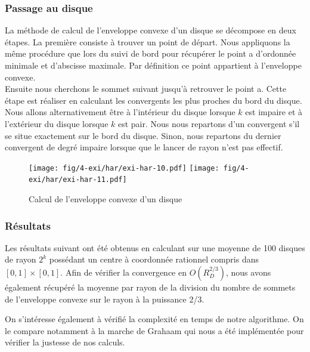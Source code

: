 
\subsubsection{Passage au disque}


La méthode de calcul de l'enveloppe convexe d'un disque se décompose en deux étapes. La première consiste à trouver un point de départ. Nous appliquons la même procédure que lors du suivi de bord pour récupérer le point a d'ordonnée minimale et d'abscisse maximale. Par définition ce point appartient à l'enveloppe convexe.\\

Ensuite nous cherchons le sommet suivant jusqu'à retrouver le point a. Cette étape est réaliser en calculant les convergents les plus proches du bord du disque. Nous allons alternativement être à l'intérieur du disque lorsque $k$ est impaire et à l'extérieur du disque lorsque $k$ est pair. Nous nous repartons d'un convergent s'il se situe exactement sur le bord du disque. Sinon, nous repartons du dernier convergent de degré impaire lorsque que le lancer de rayon n'est pas effectif.\\

\begin{figure}[H]
  \centering
  \texttt{[image: fig/4-exi/har/exi-har-10.pdf]}
  \texttt{[image: fig/4-exi/har/exi-har-11.pdf]}
  \caption{Calcul de l'enveloppe convexe d'un disque}
\end{figure}

\subsubsection{Résultats}

Les résultats suivant ont été obtenus en calculant sur une moyenne de 100 disques de rayon $2^k$ possédant un centre à coordonnée rationnel compris dans $[0,1]\times[0,1]$. Afin de vérifier la convergence en $O(R_{D}^{2/3})$, nous avons également récupéré la moyenne par rayon de la division du nombre de sommets de l'enveloppe convexe sur le rayon à la puissance 2/3.

On s'intéresse également à vérifié la complexité en temps de notre algorithme. On le compare notamment à la marche de Grahaam qui nous a été implémentée pour vérifier la justesse de nos calculs. 

